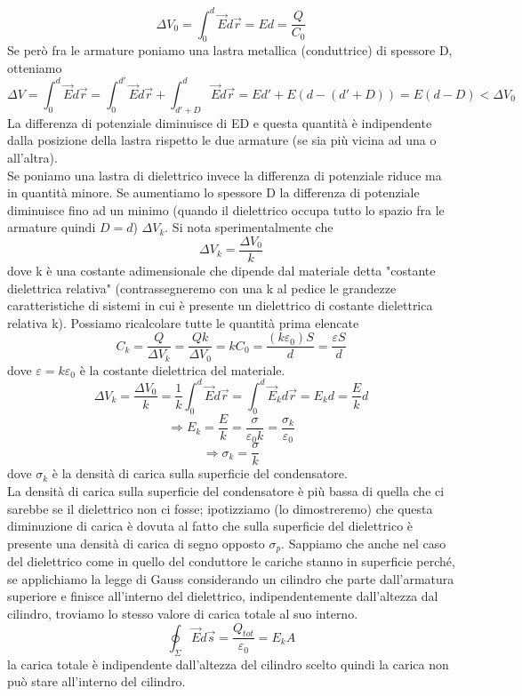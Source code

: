 \documentclass[10pt,a4paper]{article}
\begin{document}
\[\Delta V_0 = \int_{0}^{d}\vec{E}d\vec{r} = Ed = \frac{Q}{C_0}\]
Se però fra le armature poniamo una lastra metallica (conduttrice) di spessore D, otteniamo
\[\Delta V = \int_{0}^{d}\vec{E}d\vec{r} = \int_{0}^{d'}\vec{E}d\vec{r} + \int_{d'+D}^{d}\vec{E}d\vec{r} = Ed' + E(d-(d'+D)) = E(d-D) < \Delta V_0 \]
La differenza di potenziale diminuisce di ED e questa quantità è indipendente dalla posizione della lastra rispetto le due armature (se sia più vicina ad una o all'altra).\\
Se poniamo una lastra di dielettrico invece la differenza di potenziale riduce ma in quantità minore. Se aumentiamo lo spessore D la differenza di potenziale diminuisce fino ad un minimo (quando il dielettrico occupa tutto lo spazio fra le armature quindi \(D = d\)) $\Delta V_k$. Si nota sperimentalmente che 
\[\Delta V_k = \frac{\Delta V_0}{k}\]
dove k è una costante adimensionale che dipende dal materiale detta "costante dielettrica relativa" (contrassegneremo con una k al pedice le grandezze caratteristiche di sistemi in cui è presente un dielettrico di costante dielettrica relativa k). Possiamo ricalcolare tutte le quantità prima elencate
\[C_k = \frac{Q}{\Delta V_k} = \frac{Qk}{\Delta V_0} = kC_0 = \frac{(k\varepsilon_0)S}{d} = \frac{\varepsilon S}{d}\]
dove $\varepsilon = k\varepsilon_0$ è la costante dielettrica del materiale. 
\[\Delta V_k = \frac{\Delta V_0}{k} = \frac{1}{k}\int_{0}^{d}\vec{E}d\vec{r} = \int_{0}^{d}\vec{E}_kd\vec{r} = E_kd = \frac{E}{k}d \]
\[\Rightarrow E_k = \frac{E}{k}= \frac{\sigma}{\varepsilon_0 k} = \frac{\sigma_k}{\varepsilon_0}\]
\[\Rightarrow \sigma_k = \frac{\sigma}{k}\]
dove $\sigma_k$ è la densità di carica sulla superficie del condensatore.\\
La densità di carica sulla superficie del condensatore è più bassa di quella che ci sarebbe se il dielettrico non ci fosse; ipotizziamo (lo dimostreremo) che questa diminuzione di carica è dovuta al fatto che sulla superficie del dielettrico è presente una densità di carica di segno opposto \(\sigma_p\). Sappiamo che anche nel caso del dielettrico come in quello del conduttore le cariche stanno in superficie perché, se applichiamo la legge di Gauss considerando un cilindro che parte dall'armatura superiore e finisce all'interno del dielettrico, indipendentemente dall'altezza dal cilindro, troviamo lo stesso valore di carica totale al suo interno.
\[\oint_\Sigma \vec{E}d\vec{s} = \frac{Q_{tot}}{\varepsilon_0} = E_k A \]
la carica totale è indipendente dall'altezza del cilindro scelto quindi la carica non può stare all'interno del cilindro.\\
\end{document}
